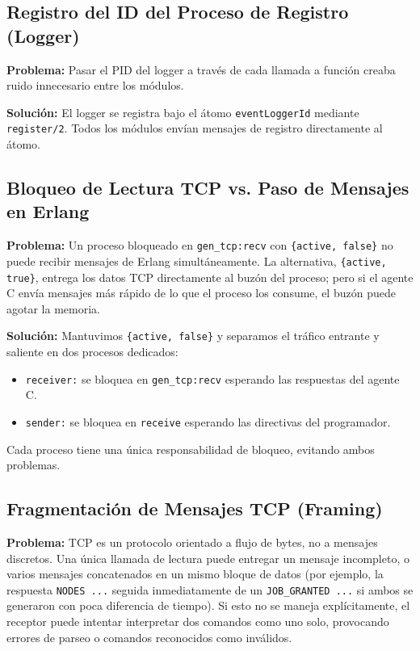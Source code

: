 \documentclass[12pt,a4paper]{article}
\begin{document}
\subsection{Registro del ID del Proceso de Registro (Logger)}

\textbf{Problema:} Pasar el PID del logger a través de cada llamada a función creaba ruido innecesario entre los módulos.

\textbf{Solución:} El logger se registra bajo el átomo \texttt{eventLoggerId} mediante \texttt{register/2}. Todos los módulos envían mensajes de registro directamente al átomo.

\subsection{Bloqueo de Lectura TCP vs. Paso de Mensajes en Erlang}

\textbf{Problema:} Un proceso bloqueado en \texttt{gen\_tcp:recv} con \texttt{\{active, false\}} no puede recibir mensajes de Erlang simultáneamente. La alternativa, \texttt{\{active, true\}}, entrega los datos TCP directamente al buzón del proceso; pero si el agente C envía mensajes más rápido de lo que el proceso los consume, el buzón puede agotar la memoria.

\textbf{Solución:} Mantuvimos \texttt{\{active, false\}} y separamos el tráfico entrante y saliente en dos procesos dedicados:
\begin{itemize}
\item \texttt{receiver:} se bloquea en \texttt{gen\_tcp:recv} esperando las respuestas del agente C.
\item \texttt{sender:} se bloquea en \texttt{receive} esperando las directivas del programador.
\end{itemize}
Cada proceso tiene una única responsabilidad de bloqueo, evitando ambos problemas.

\subsection{Fragmentación de Mensajes TCP (Framing)}

\textbf{Problema:} TCP es un protocolo orientado a flujo de bytes, no a mensajes discretos. Una única llamada de lectura puede entregar un mensaje incompleto, o varios mensajes concatenados en un mismo bloque de datos (por ejemplo, la respuesta \texttt{NODES ...} seguida inmediatamente de un \texttt{JOB\_GRANTED ...} si ambos se generaron con poca diferencia de tiempo). Si esto no se maneja explícitamente, el receptor puede intentar interpretar dos comandos como uno solo, provocando errores de parseo o comandos reconocidos como inválidos.
\end{document}
